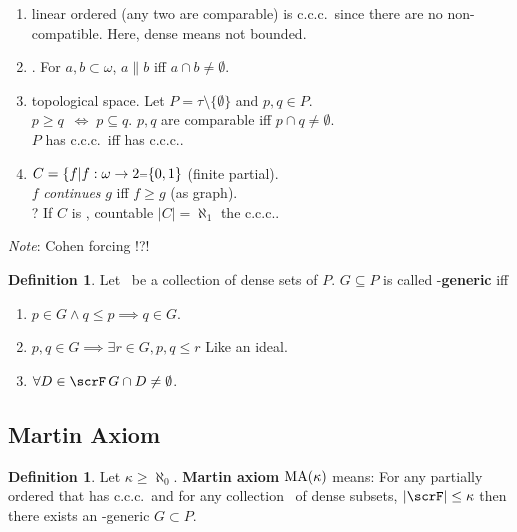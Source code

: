 \documentclass[11pt,pdftex,twoside,a4paper]{article}
\newcommand{\B}[1]{\textbf{#1}}
\newcommand{\MA}{\ensuremath{\mathop{\rm MA}\nolimits}}
\newcommand{\ccc}{c.c.c.}
\theoremstyle{definition}
\newtheorem{ldef}[thm]{Definition}
\begin{document}
\begin{enumerate}
\item {} linear ordered (any two are comparable)
is \ccc\ since there are no non-compatible.
Here, dense means not bounded.

\item {}. %
For \(a,b\subset \omega\), \(a\|b\) iff \(a\cap b \neq \emptyset\).

\item {} topological space.
Let \(P = \tau \setminus \{\emptyset\}\) and \(p,q \in P\).\\
\(p \geq q\ \;\iff\; p \subseteq q\).
\(p,q\) are comparable iff \(p\cap q\neq \emptyset\).\\
$P$ has \ccc\ iff  has \ccc.

\item \(C = \{f| f: \omega \to 2 \mathsmaller=\{0,1\}\)
(finite partial).\\
$f$ \emph{continues} $g$ iff  \(f \geq g\) (as graph).\\
? If $C$ is , countable \(|C| = \aleph_1\) the \ccc.
\end{enumerate}

\emph{Note}: Cohen forcing !?!

\begin{ldef}
Let \scrF\ be a collection of dense sets of $P$.
\(G \subseteq P\) is called \scrF-\B{generic} iff 
\begin{enumerate}
\item \(p\in G \land q\leq p \implies q \in G\).
\item \(p,q \in G \implies \exists r\in G, p,q\leq r\) Like an ideal.
\item \(\forall D \in \scrF\, G\cap D \neq \emptyset\).
\end{enumerate}
\end{ldef}

\subsection{Martin Axiom}

\begin{ldef}
Let \(\kappa \geq \aleph_0\).
\B{Martin axiom} \(\MA(\kappa)\) means:
For any partially ordered  that has \ccc\
and for any collection \scrF\ of dense subsets, \(|\scrF| \leq \kappa\)
then there exists an \scrF-generic \(G\subset P\).
\end{ldef}
\end{document}
